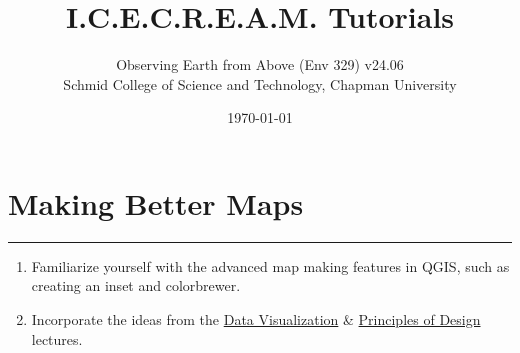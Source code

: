 \documentclass[oneside,a4paper,11pt,explicit]{book}
\title{I.C.E.C.R.E.A.M. Tutorials}
\subtitle{\small Observing Earth from Above (Env 329) v24.06 \\
	\small Schmid College of Science and Technology, Chapman University}
\date{\today}
\begin{document}
\dominitoc

\faketableofcontents

\setcounter{chapter}{11} %

\chapter{Making Better Maps} %

\vspace{-2em}

\minitoc

\hrule

\vspace{1em}

\begin{tcolorbox}[enhanced,frame style image=blueshade.png,
	opacityback=0.75,opacitybacktitle=0.25,
	colback=blue!5!white,colframe=blue!75!black,title={\Large \textbf{Objectives:}}]
	\large
	\begin{enumerate}
		\item Familiarize yourself with the advanced map making features in QGIS, such as creating an inset and colorbrewer.
		\item Incorporate the ideas from the \href{https://www.observingearthfromabove.com/uploads/b/150001442-463159049665547396/davidoff_unedited_130.mp4}{Data Visualization} \& \href{https://www.observingearthfromabove.com/uploads/b/150001442-463159049665547396/jan_export_final_101.mp4}{Principles of Design} lectures.
	\end{enumerate}
\end{tcolorbox}

\clearpage 
\end{document}
